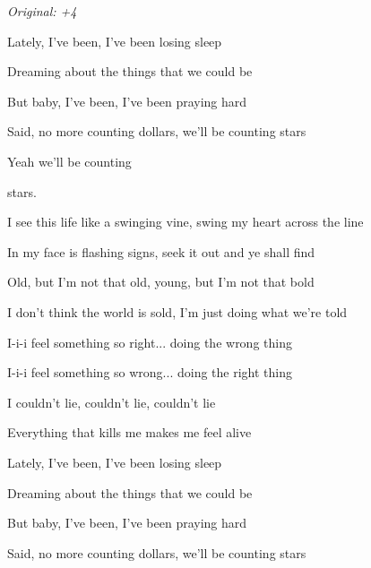 \begin{song}


\begin{strumbox}
\textit{Original: +4}
\end{strumbox}

\begin{chordbox}
\vspace{2em}
\end{chordbox}


\bigskip

Lately, I've been, I've been losing sleep \par
{} Dreaming about the things that we could be \par
But baby, I've been, I've been praying hard \par
{} Said, no more counting dollars, we'll be counting stars \par
{} Yeah we'll be counting  \par

\bigskip

stars.    \par

\bigskip

I see this life like a swinging vine, swing my heart across the line \par
{}In my face is flashing signs,  seek it out and ye shall find \par
{}Old, but I'm not that old, young, but I'm not that bold \par
{}I don't think the world is sold,  I'm just doing what we're told \par

\bigskip

 I-i-i feel something so right... doing the wrong thing \par
{} I-i-i feel something so wrong... doing the right thing \par
{} I couldn't lie, couldn't lie, couldn't lie \par
{}Everything that kills me makes me feel alive \par

\bigskip

\begin{chorusbox}{\Chorus}
Lately, I've been, I've been losing sleep \par
{} Dreaming about the things that we could be \par
But baby, I've been, I've been praying hard \par
{} Said, no more counting dollars, we'll be counting stars \par


\end{chorusbox}
\end{song}
